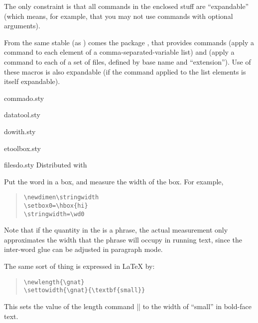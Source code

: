 The only constraint is that all commands in the enclosed stuff are
``expandable'' (which means, for example, that you may not use
commands with optional arguments).

From the same stable (as ) comes the package
, that provides commands  (apply a
command to each element of a comma-separated-variable list) and
 (apply a command to each of a set of files,
defined by base name and ``extension'').  Use of these 
macros is also expandable (if the command applied to the list elements
is itself expandable).
\begin{ctanrefs}
\item[commado.sty]
\item[datatool.sty]
\item[dowith.sty]
\item[etoolbox.sty]
\item[filesdo.sty]Distributed with 
\end{ctanrefs}



Put the word in a box, and measure the width of the box. For example,
\begin{quote}
\begin{verbatim}
\newdimen\stringwidth
\setbox0=\hbox{hi}
\stringwidth=\wd0
\end{verbatim}
\end{quote}
Note that if the quantity in the  is a phrase, the actual
measurement only approximates the width that the phrase will occupy in
running text, since the inter-word glue can be adjusted in paragraph
mode.

The same sort of thing is expressed in \LaTeX{} by:
\begin{quote}
\begin{verbatim}
\newlength{\gnat}
\settowidth{\gnat}{\textbf{small}}
\end{verbatim}
\end{quote}
This sets the value of the length command |\gnat| to the width of ``small''
in bold-face text.


